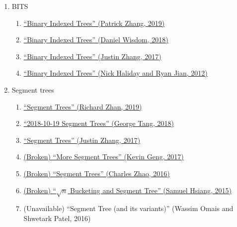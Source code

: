 \documentclass[11pt, oneside]{article}
\begin{document}
\begin{enumerate}
  \item BITS
    \begin{enumerate}
      \item \href{https://activities.tjhsst.edu/sct/lectures/1920/2019_11_01_Binary_Index_Trees.pdf}{``Binary Indexed Trees'' (Patrick Zhang, 2019)}
      \item \href{https://activities.tjhsst.edu/sct/lectures/1819/2018_11_30_Binary_Indexed_Trees.pdf}{``Binary Indexed Trees'' (Daniel Wisdom, 2018)}
      \item \href{https://activities.tjhsst.edu/sct/lectures/1718/2017-11-10_Binary_Indexed_Trees.pdf}{``Binary Indexed Trees'' (Justin Zhang, 2017)}
      \item \href{https://activities.tjhsst.edu/sct/lectures/1213/bit_09_28_12.pdf}{``Binary Indexed Trees'' (Nick Haliday and Ryan Jian, 2012)}
    \end{enumerate}

  \item Segment trees
    \begin{enumerate}
      \item \href{https://activities.tjhsst.edu/sct/lectures/1920/2019_11_15_Segment_Trees.pdf}{``Segment Trees'' (Richard Zhan, 2019)}
      \item \href{https://activities.tjhsst.edu/sct/lectures/1819/2018_10_19_Segment_Trees.pdf}{``2018-10-19 Segment Trees'' (George Tang, 2018)}
      \item \href{https://activities.tjhsst.edu/sct/lectures/1718/2017-12-08_Segment_Trees.pdf}{``Segment Trees'' (Justin Zhang, 2017)}
      \item \href{https://activities.tjhsst.edu/sct/lectures/1617/2017-01-13_More_Segment_Trees.pdf}{(Broken) ``More Segment Trees'' (Kevin Geng, 2017)}
      \item \href{https://activities.tjhsst.edu/sct/lectures/1617/2016-10-28_Segment_Trees.pdf}{(Broken) ``Segment Trees'' (Charles Zhao, 2016)}
      \item \href{https://activities.tjhsst.edu/sct/lectures/1516/SCT_Segment_Tree.pdf}{(Broken) ``\( \sqrt{n} \) Bucketing and Segment Tree'' (Samuel Hsiang, 2015)}
      \item (Unavailable) ``Segment Tree (and its variants)'' (Wassim Omais and Shwetark Patel, 2016)
    \end{enumerate}


\end{enumerate}
\end{document}
